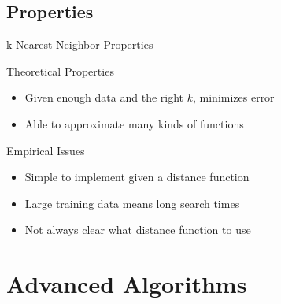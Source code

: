 \documentclass[12pt]{beamer}
\begin{document}
\subsection{Properties}
\begin{frame}[<+->]{k-Nearest Neighbor Properties}
	\begin{block}{Theoretical Properties}
		\begin{itemize}
			\item Given enough data and the right $k$, minimizes error
			\item Able to approximate many kinds of functions
		\end{itemize}
	\end{block}
	\begin{block}{Empirical Issues}
		\begin{itemize}
			\item Simple to implement given a distance function
			\item Large training data means long search times
			\item Not always clear what distance function to use
		\end{itemize}
	\end{block}
\end{frame}


\section{Advanced Algorithms}
\end{document}
